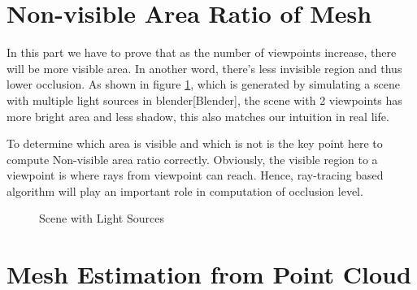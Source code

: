 \documentclass[11pt, a4paper,oneside,chapterprefix=false]{scrbook}
\begin{document}
\section{Non-visible Area Ratio of Mesh} \label{sec:Non-visible area ratio of mesh}

In this part we have to prove that as the number of viewpoints increase, there will be more visible area. In another word, there's less invisible region and thus lower occlusion. As shown in figure \ref{fig:scene with light sources}, which is generated by simulating a scene with multiple light sources in blender[Blender], the scene with 2 viewpoints has more bright area and less shadow, this also matches our intuition in real life. 

\vspace{10pt}

To determine which area is visible and which is not is the key point here to compute Non-visible area ratio correctly. Obviously, the visible region to a viewpoint is where rays from viewpoint can reach. Hence, ray-tracing based algorithm will play an important role in computation of occlusion level.  

\begin{figure}[H]
    \centering
     \hfill
    \caption{Scene with Light Sources}
    \label{fig:scene with light sources}
\end{figure}

\section{Mesh Estimation from Point Cloud} \label{mesh estimation of point cloud}
\end{document}
